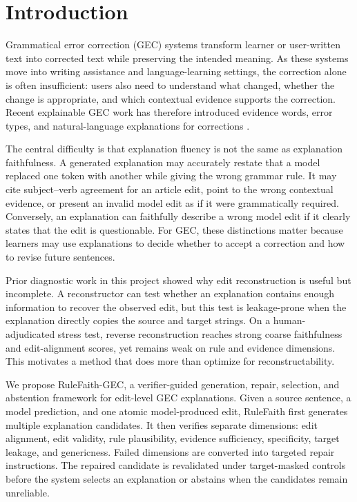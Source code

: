 \section{Introduction}

Grammatical error correction (GEC) systems transform learner or user-written text into corrected text while preserving the intended meaning. As these systems move into writing assistance and language-learning settings, the correction alone is often insufficient: users also need to understand what changed, whether the change is appropriate, and which contextual evidence supports the correction. Recent explainable GEC work has therefore introduced evidence words, error types, and natural-language explanations for corrections \cite{fei-etal-2023-enhancing,song-etal-2024-gee,kaneko-okazaki-2024-controlled,ye2025excgec}.

The central difficulty is that explanation fluency is not the same as explanation faithfulness. A generated explanation may accurately restate that a model replaced one token with another while giving the wrong grammar rule. It may cite subject--verb agreement for an article edit, point to the wrong contextual evidence, or present an invalid model edit as if it were grammatically required. Conversely, an explanation can faithfully describe a wrong model edit if it clearly states that the edit is questionable. For GEC, these distinctions matter because learners may use explanations to decide whether to accept a correction and how to revise future sentences.

Prior diagnostic work in this project showed why edit reconstruction is useful but incomplete. A reconstructor can test whether an explanation contains enough information to recover the observed edit, but this test is leakage-prone when the explanation directly copies the source and target strings. On a human-adjudicated stress test, reverse reconstruction reaches strong coarse faithfulness and edit-alignment scores, yet remains weak on rule and evidence dimensions. This motivates a method that does more than optimize for reconstructability.

We propose RuleFaith-GEC, a verifier-guided generation, repair, selection, and abstention framework for edit-level GEC explanations. Given a source sentence, a model prediction, and one atomic model-produced edit, RuleFaith first generates multiple explanation candidates. It then verifies separate dimensions: edit alignment, edit validity, rule plausibility, evidence sufficiency, specificity, target leakage, and genericness. Failed dimensions are converted into targeted repair instructions. The repaired candidate is revalidated under target-masked controls before the system selects an explanation or abstains when the candidates remain unreliable.

